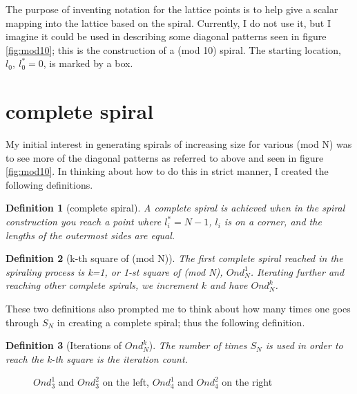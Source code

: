 \documentclass[11pt]{amsart}
\theoremstyle{mydef}
\newtheorem{definition}{Definition}
\begin{document}
The purpose of inventing notation for the lattice points is to help give a scalar mapping into the lattice based on the spiral. Currently, I do not use it, but I imagine it could be used in describing some diagonal patterns seen in figure \ref{fig:mod10}; this is the construction of a (mod 10) spiral. The starting location, $l_0,\ l^*_0 = 0$, is marked by a box.



\section{complete spiral}
My initial interest in generating spirals of increasing size for various (mod N) was to see more of the diagonal patterns as referred to above and seen in figure \ref{fig:mod10}. In thinking about how to do this in strict manner, I created the following definitions.

\begin{definition}[complete spiral]
A complete spiral is achieved when in the spiral construction you reach a point where $l^*_i = N-1$, $l_i$ is on a corner, and the lengths of the outermost sides are equal.
\end{definition}

\begin{definition}[k-th square of (mod N)]
The first complete spiral reached in the spiraling process is k=1, or 1-st square of (mod N),  $Ond^1_N$. Iterating further and reaching other complete spirals, we increment $k$ and have $Ond^k_N$.
\end{definition}

These two definitions also prompted me to think about how many times one goes through $S_N$ in creating a complete spiral; thus the following definition.

\begin{definition}[Iterations of $Ond^k_N$]
The number of times $S_N$ is used in order to reach the k-th square is the iteration count.
\end{definition}

\begin{figure}[h]
\centering
{}
\caption{$Ond^1_3$ and $Ond^2_3$ on the left, $Ond^1_4$ and $Ond^2_4$ on the right}
\label{fig:mod34}
\end{figure}
\end{document}
